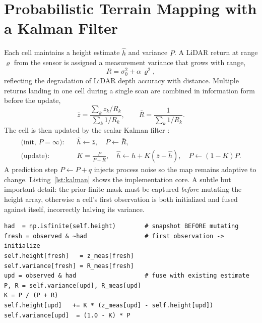 \documentclass[11pt]{article}
\begin{document}
\section{Probabilistic Terrain Mapping with a Kalman Filter}
\label{sec:kalman}

Each cell maintains a height estimate $\hat h$ and variance $P$. A LiDAR return at
range $\varrho$ from the sensor is assigned a measurement variance that grows with
range,
\begin{equation}
R = \sigma_0^2 + \alpha\,\varrho^2,
\label{eq:measvar}
\end{equation}
reflecting the degradation of LiDAR depth accuracy with distance. Multiple returns
landing in one cell during a single scan are combined in information form before
the update,
\begin{equation}
\bar z = \frac{\sum_k z_k/R_k}{\sum_k 1/R_k},\qquad
\bar R = \frac{1}{\sum_k 1/R_k}.
\label{eq:combine}
\end{equation}
The cell is then updated by the scalar Kalman filter
\cite{kalman1960,thrun2005,fankhauser2018}:
\begin{align}
\text{(init, } P=\infty\text{):}\quad & \hat h \leftarrow \bar z,\quad P \leftarrow \bar R, \label{eq:kinit}\\
\text{(update):}\quad & K = \frac{P}{P+\bar R},\quad
   \hat h \leftarrow \hat h + K(\bar z - \hat h),\quad
   P \leftarrow (1-K)P. \label{eq:kupdate}
\end{align}
A prediction step $P \leftarrow P + q$ injects process noise so the map remains
adaptive to change. Listing~\ref{lst:kalman} shows the implementation core. A
subtle but important detail: the prior-finite mask must be captured \emph{before}
mutating the height array, otherwise a cell's first observation is both
initialized and fused against itself, incorrectly halving its variance.

\begin{lstlisting}[style=py, caption={Per-cell Kalman fusion (information-form combine then scalar update).}, label={lst:kalman}]
had  = np.isfinite(self.height)        # snapshot BEFORE mutating
fresh = observed & ~had                # first observation -> initialize
self.height[fresh]   = z_meas[fresh]
self.variance[fresh] = R_meas[fresh]
upd = observed & had                   # fuse with existing estimate
P, R = self.variance[upd], R_meas[upd]
K = P / (P + R)
self.height[upd]   += K * (z_meas[upd] - self.height[upd])
self.variance[upd]  = (1.0 - K) * P
\end{lstlisting}
\end{document}
